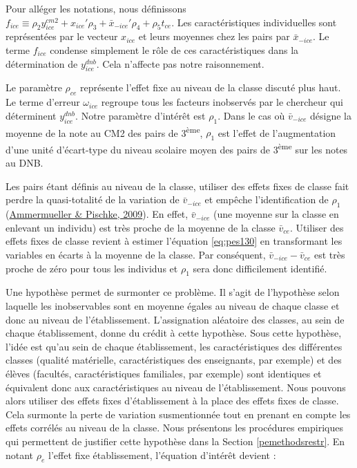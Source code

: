 \documentclass[
]{book}
\begin{document}
\quad Pour alléger les notations, nous définissons \(f_{ice} \equiv \rho_2 y^{cm2}_{ice} + x_{ice}' \rho_3 + \bar{x}_{-ice}' \rho_4 + \rho_5 t_{ce}\). Les caractéristiques individuelles sont représentées par le vecteur \(x_{ice}\) et leurs moyennes chez les pairs par \(\bar{x}_{-ice}\). Le terme \(f_{ice}\) condense simplement le rôle de ces caractéristiques dans la détermination de \(y^{dnb}_{ice}\). Cela n'affecte pas notre raisonnement.

Le paramètre \(\rho_{ce}\) représente l'effet fixe au niveau de la classe discuté plus haut. Le terme d'erreur \(\omega_{ice}\) regroupe tous les facteurs inobservés par le chercheur qui déterminent \(y^{dnb}_{ice}\). Notre paramètre d'intérêt est \(\rho_1\). Dans le cas où \(\bar{v}_{-ice}\) désigne la moyenne de la note au CM2 des pairs de 3\textsuperscript{ème}, \(\rho_1\) est l'effet de l'augmentation d'une unité d'écart-type du niveau scolaire moyen des pairs de 3\textsuperscript{ème} sur les notes au DNB.

\quad Les pairs étant définis au niveau de la classe, utiliser des effets fixes de classe fait perdre la quasi-totalité de la variation de \(\bar{v}_{-ice}\) et empêche l'identification de \(\rho_1\) (\protect\hyperlink{ref-AMM:PIS:09}{Ammermueller \& Pischke, 2009}). En effet, \(\bar{v}_{-ice}\) (une moyenne sur la classe en enlevant un individu) est très proche de la moyenne de la classe \(\bar{v}_{ce}\). Utiliser des effets fixes de classe revient à estimer l'équation \eqref{eq:pes130} en transformant les variables en écarts à la moyenne de la classe. Par conséquent, \(\bar{v}_{-ice} - \bar{v}_{ce}\) est très proche de zéro pour tous les individus et \(\rho_1\) sera donc difficilement identifié.

\quad Une hypothèse permet de surmonter ce problème. Il s'agit de l'hypothèse selon laquelle les inobservables sont en moyenne égales au niveau de chaque classe et donc au niveau de l'établissement. L'assignation aléatoire des classes, au sein de chaque établissement, donne du crédit à cette hypothèse. Sous cette hypothèse, l'idée est qu'au sein de chaque établissement, les caractéristiques des différentes classes (qualité matérielle, caractéristiques des enseignants, par exemple) et des élèves (facultés, caractéristiques familiales, par exemple) sont identiques et équivalent donc aux caractéristiques au niveau de l'établissement. Nous pouvons alors utiliser des effets fixes d'établissement à la place des effets fixes de classe. Cela surmonte la perte de variation susmentionnée tout en prenant en compte les effets corrélés au niveau de la classe. Nous présentons les procédures empiriques qui permettent de justifier cette hypothèse dans la Section \ref{pemethodsrestr}. En notant \(\rho_e\) l'effet fixe établissement, l'équation d'intérêt devient :
\end{document}

